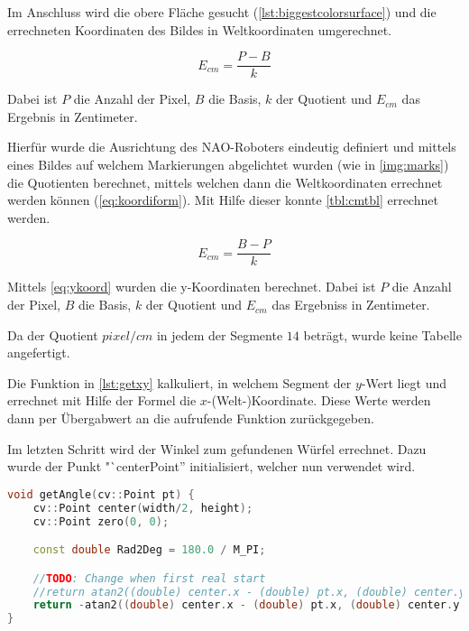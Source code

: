         Im Anschluss wird die obere Fläche gesucht
        (\autoref{lst:biggestcolorsurface}) und die errechneten Koordinaten des
        Bildes in Weltkoordinaten umgerechnet.

        \begin{equation} \label{eq:koordiform}
            E_{cm} = \frac{P - B}{k}
        \end{equation}

        Dabei ist $P$ die Anzahl der Pixel, $B$ die Basis, $k$ der Quotient und
        $E_{cm}$ das Ergebnis in Zentimeter.

        Hierfür wurde die Ausrichtung des NAO-Roboters eindeutig definiert und
        mittels eines Bildes auf welchem Markierungen abgelichtet wurden
        (wie in \autoref{img:marks})
        die Quotienten berechnet, mittels welchen dann die Weltkoordinaten
        errechnet werden können (\ref{eq:koordiform}).
        Mit Hilfe dieser konnte \autoref{tbl:cmtbl} errechnet werden.

        \begin{equation} \label{eq:ykoord}
            E_{cm} = \frac{B - P}{k}
        \end{equation}

        Mittels \ref{eq:ykoord} wurden die y-Koordinaten berechnet.
        Dabei ist $P$ die Anzahl der Pixel, $B$ die Basis, $k$ der Quotient und
        $E_{cm}$ das Ergebniss in Zentimeter.

        Da der Quotient $pixel / cm$ in jedem der Segmente $14$ beträgt, wurde
        keine Tabelle angefertigt.

        Die Funktion in \autoref{lst:getxy} kalkuliert, in welchem Segment der
        $y$-Wert liegt und errechnet mit Hilfe der Formel die
        $x$-(Welt-)Koordinate.
        Diese Werte werden dann per Übergabwert an die aufrufende Funktion
        zurückgegeben.

        Im letzten Schritt wird der Winkel zum gefundenen Würfel errechnet.
        Dazu wurde der Punkt "`centerPoint'' initialisiert, welcher nun
        verwendet wird.

\begin{lstlisting}[language=c++,
                   caption={Funktion: "`getAngle''},
                   label={lst:getAngle}]
void getAngle(cv::Point pt) {
    cv::Point center(width/2, height);
    cv::Point zero(0, 0);

    const double Rad2Deg = 180.0 / M_PI;

    //TODO: Change when first real start
    //return atan2((double) center.x - (double) pt.x, (double) center.y - (double) pt.y) * Rad2Deg; //degree
    return -atan2((double) center.x - (double) pt.x, (double) center.y - (double)pt.y); //rad
}
\end{lstlisting}

